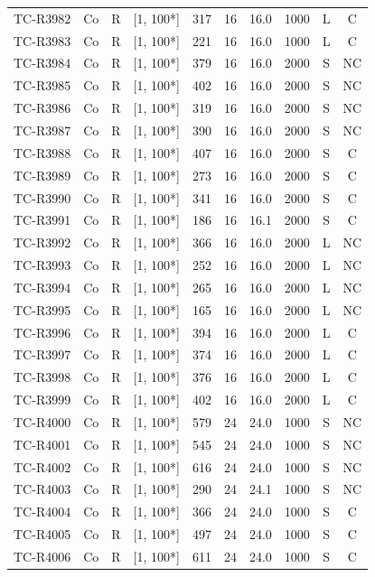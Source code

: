 \begin{longtable}{lccccccccc}
TC-R3982 & Co & R & [1, 100*] & 317 & 16 & 16.0 & 1000 & L & C \\
TC-R3983 & Co & R & [1, 100*] & 221 & 16 & 16.0 & 1000 & L & C \\
TC-R3984 & Co & R & [1, 100*] & 379 & 16 & 16.0 & 2000 & S & NC \\
TC-R3985 & Co & R & [1, 100*] & 402 & 16 & 16.0 & 2000 & S & NC \\
TC-R3986 & Co & R & [1, 100*] & 319 & 16 & 16.0 & 2000 & S & NC \\
TC-R3987 & Co & R & [1, 100*] & 390 & 16 & 16.0 & 2000 & S & NC \\
TC-R3988 & Co & R & [1, 100*] & 407 & 16 & 16.0 & 2000 & S & C \\
TC-R3989 & Co & R & [1, 100*] & 273 & 16 & 16.0 & 2000 & S & C \\
TC-R3990 & Co & R & [1, 100*] & 341 & 16 & 16.0 & 2000 & S & C \\
TC-R3991 & Co & R & [1, 100*] & 186 & 16 & 16.1 & 2000 & S & C \\
TC-R3992 & Co & R & [1, 100*] & 366 & 16 & 16.0 & 2000 & L & NC \\
TC-R3993 & Co & R & [1, 100*] & 252 & 16 & 16.0 & 2000 & L & NC \\
TC-R3994 & Co & R & [1, 100*] & 265 & 16 & 16.0 & 2000 & L & NC \\
TC-R3995 & Co & R & [1, 100*] & 165 & 16 & 16.0 & 2000 & L & NC \\
TC-R3996 & Co & R & [1, 100*] & 394 & 16 & 16.0 & 2000 & L & C \\
TC-R3997 & Co & R & [1, 100*] & 374 & 16 & 16.0 & 2000 & L & C \\
TC-R3998 & Co & R & [1, 100*] & 376 & 16 & 16.0 & 2000 & L & C \\
TC-R3999 & Co & R & [1, 100*] & 402 & 16 & 16.0 & 2000 & L & C \\
TC-R4000 & Co & R & [1, 100*] & 579 & 24 & 24.0 & 1000 & S & NC \\
TC-R4001 & Co & R & [1, 100*] & 545 & 24 & 24.0 & 1000 & S & NC \\
TC-R4002 & Co & R & [1, 100*] & 616 & 24 & 24.0 & 1000 & S & NC \\
TC-R4003 & Co & R & [1, 100*] & 290 & 24 & 24.1 & 1000 & S & NC \\
TC-R4004 & Co & R & [1, 100*] & 366 & 24 & 24.0 & 1000 & S & C \\
TC-R4005 & Co & R & [1, 100*] & 497 & 24 & 24.0 & 1000 & S & C \\
TC-R4006 & Co & R & [1, 100*] & 611 & 24 & 24.0 & 1000 & S & C \\

\end{longtable}
